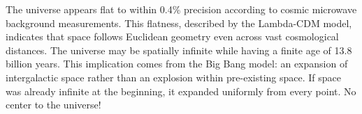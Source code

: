 The universe appears flat to within 0.4\% precision according to cosmic microwave background measurements. This flatness, described by the Lambda-CDM model, indicates that space follows Euclidean geometry even across vast cosmological distances. The universe may be spatially infinite while having a finite age of 13.8 billion years. This implication comes from the Big Bang model: an expansion of intergalactic space rather than an explosion within pre-existing space. If space was already infinite at the beginning, it expanded uniformly from every point. No center to the universe!
